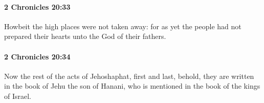 		\paragraph{2 Chronicles 20:33} %
			\label{2CHRONICLES-20-33}

			Howbeit the high places were not taken away: for as yet the people had not prepared their hearts unto the God of their fathers.


		\paragraph{2 Chronicles 20:34} %
			\label{2CHRONICLES-20-34}

			Now the rest of the acts of Jehoshaphat, first and last, behold, they are written in the book of Jehu the son of Hanani, who is mentioned in the book of the kings of Israel.


